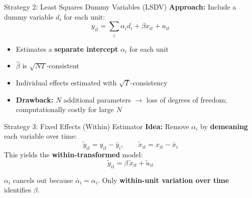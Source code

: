 \documentclass[aspectratio=169]{beamer}
\newenvironment{callout-tip}[1][Tip]{%
  \begin{tcolorbox}[colback=tipbg, colframe=tipframe,
    title={\textbf{#1}}, fonttitle=\small\bfseries,
    left=4pt, right=4pt, top=2pt, bottom=2pt]
}{\end{tcolorbox}}
\begin{document}
\begin{frame}{Strategy 2: Least Squares Dummy Variables (LSDV)}
  \textbf{Approach:} Include a dummy variable $d_i$ for each unit:
  \[
    y_{it} = \sum_i \alpha_i d_i + \beta x_{it} + u_{it}
  \]
  \begin{itemize}
    \item<2-> Estimates a \textbf{separate intercept} $\alpha_i$ for each unit
    \item<3-> $\hat{\beta}$ is $\sqrt{NT}$-consistent
    \item<4-> Individual effects estimated with $\sqrt{T}$-consistency
    \item<5-> \textbf{Drawback:} $N$ additional parameters $\rightarrow$ loss of degrees of freedom; computationally costly for large $N$
  \end{itemize}
\end{frame}

\begin{frame}{Strategy 3: Fixed Effects (Within) Estimator}
  \textbf{Idea:} Remove $\alpha_i$ by \textbf{demeaning} each variable over time:
  \[
    \tilde{y}_{it} = y_{it} - \bar{y}_{i}, \qquad \tilde{x}_{it} = x_{it} - \bar{x}_{i}
  \]
  This yields the \textbf{within-transformed} model:
  \[
    \tilde{y}_{it} = \beta\,\tilde{x}_{it} + \tilde{u}_{it}
  \]

  \vspace{0.4em}
  \begin{callout-tip}
    $\alpha_i$ cancels out because $\bar{\alpha}_i = \alpha_i$. Only \textbf{within-unit variation over time} identifies $\beta$.
  \end{callout-tip}
\end{frame}
\end{document}
